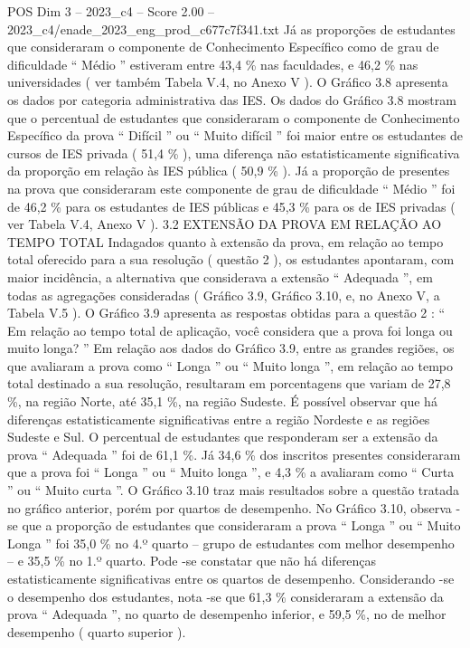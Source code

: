 \begin{textsample}{POS Dim 3 – 2023\_c4 – Score 2.00 – 2023\_c4/enade\_2023\_eng\_prod\_c677c7f341.txt}
Já as proporções de estudantes que consideraram o componente de Conhecimento Específico como de grau de dificuldade “ Médio ” estiveram entre 43,4 \% nas faculdades, e 46,2 \% nas universidades ( ver também Tabela V.4, no Anexo V ).
O Gráfico 3.8 apresenta os dados por categoria administrativa das IES.
Os dados do Gráfico 3.8 mostram que o percentual de estudantes que consideraram o componente de Conhecimento Específico da prova “ Difícil ” ou “ Muito difícil ” foi maior entre os estudantes de cursos de IES privada ( 51,4 \% ), uma diferença não estatisticamente significativa da proporção em relação às IES pública ( 50,9 \% ).
Já a proporção de presentes na prova que consideraram este componente de grau de dificuldade “ Médio ” foi de 46,2 \% para os estudantes de IES públicas e 45,3 \% para os de IES privadas ( ver Tabela V.4, Anexo V ). 3.2 EXTENSÃO DA PROVA EM RELAÇÃO AO TEMPO TOTAL Indagados quanto à extensão da prova, em relação ao tempo total oferecido para a sua resolução ( questão 2 ), os estudantes apontaram, com maior incidência, a alternativa que considerava a extensão “ Adequada ”, em todas as agregações consideradas ( Gráfico 3.9, Gráfico 3.10, e, no Anexo V, a Tabela V.5 ).
O Gráfico 3.9 apresenta as respostas obtidas para a questão 2 : “ Em relação ao tempo total de aplicação, você considera que a prova foi longa ou muito longa? ” Em relação aos dados do Gráfico 3.9, entre as grandes regiões, os que avaliaram a prova como “ Longa ” ou “ Muito longa ”, em relação ao tempo total destinado a sua resolução, resultaram em porcentagens que variam de 27,8 \%, na região Norte, até 35,1 \%, na região Sudeste.
É possível observar que há diferenças estatisticamente significativas entre a região Nordeste e as regiões Sudeste e Sul.
O percentual de estudantes que responderam ser a extensão da prova “ Adequada ” foi de 61,1 \%.
Já 34,6 \% dos inscritos presentes consideraram que a prova foi “ Longa ” ou “ Muito longa ”, e 4,3 \% a avaliaram como “ Curta ” ou “ Muito curta ”.
O Gráfico 3.10 traz mais resultados sobre a questão tratada no gráfico anterior, porém por quartos de desempenho.
No Gráfico 3.10, observa -se que a proporção de estudantes que consideraram a prova “ Longa ” ou “ Muito Longa ” foi 35,0 \% no 4.º quarto – grupo de estudantes com melhor desempenho – e 35,5 \% no 1.º quarto.
Pode -se constatar que não há diferenças estatisticamente significativas entre os quartos de desempenho.
Considerando -se o desempenho dos estudantes, nota -se que 61,3 \% consideraram a extensão da prova “ Adequada ”, no quarto de desempenho inferior, e 59,5 \%, no de melhor desempenho ( quarto superior ).

\end{textsample}

